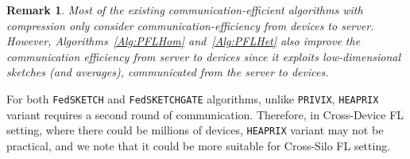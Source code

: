 \documentclass{article} %
\newtheorem{remark}{Remark}
\newcommand\DrawBox[3][]{%
  \begin{tikzpicture}[remember picture,overlay]
    \draw[overlay,fill=gray!30,#1] 
    ([xshift=10em,yshift=-0.4ex]{pic cs:#2}) 
    rectangle 
    ([xshift=-4pt,yshift=1.1ex]pic cs:#3);
  \end{tikzpicture}%
}
\newcommand\DrawBoxx[3][]{%
  \begin{tikzpicture}[remember picture,overlay]
    \draw[overlay,fill=gray!30,#1] 
    ([xshift=-8.0em,yshift=-1.0ex]{pic cs:#2}) 
    rectangle 
    ([xshift=50pt,yshift=-1.2ex]pic cs:#3);
  \end{tikzpicture}%
}
\begin{document}
\begin{remark}\label{rmk:bidirect}
Most of the existing communication-efficient algorithms with compression only consider communication-efficiency from devices to server. However, Algorithms~\ref{Alg:PFLHom} and~\ref{Alg:PFLHet} also improve the communication efficiency from server to devices since it exploits low-dimensional sketches (and averages), communicated from the server to devices. 
\end{remark}
For both \texttt{FedSKETCH} and \texttt{FedSKETCHGATE} algorithms, unlike \texttt{PRIVIX}, \texttt{HEAPRIX} variant requires a second round of communication. 
Therefore, in Cross-Device FL setting, where there could be millions of devices, \texttt{HEAPRIX} variant may not be practical, and we note that it could be more suitable for Cross-Silo FL setting. 
\end{document}
